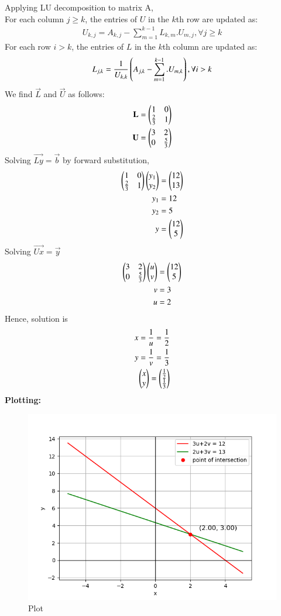 \documentclass[journal]{IEEEtran}
\begin{document}
Applying LU decomposition to matrix A, \\
For each column $j \geq k$, the entries of $U$ in the $k$th row are updated as:
\begin{align}
    U_{k,j} = A_{k,j} - \sum_{m=1}^{k-1} L_{k,m}.U_{m,j},   \forall{j \geq k}
\end{align}
For each row $i > k$, the entries of $L$ in the $k$th column are updated as:
\begin{align}
    L_{j,k} = \frac{1}{U_{k,k}}\left(A_{j,k} - \sum_{m=1}^{k-1}.U_{m,k}\right), \forall{i>k}
\end{align}
We find $\vec{L}$ and $\vec{U}$ as follows:
\begin{align}
    \mathbf{L}=\begin{pmatrix}1 & 0 \\ \frac{2}{3}&1\end{pmatrix}\\
    \mathbf{U}=\begin{pmatrix}3 & 2\\0 & \frac{5}{3}\end{pmatrix}
\end{align}
Solving $\vec{Ly}=\vec{b}$ by forward substitution,
\begin{align}
    \begin{pmatrix}1 & 0 \\ \frac{2}{3}&1\end{pmatrix}\begin{pmatrix}y_1\\y_2\end{pmatrix}&=\begin{pmatrix}12 \\ 13\end{pmatrix}\\
    y_1&=12\\
    y_2&=5\\
    y&=\begin{pmatrix}12\\5\end{pmatrix}
\end{align}
Solving $\vec{Ux}=\vec{y}$
\begin{align}
    \begin{pmatrix}3 & 2\\0 & \frac{5}{3}\end{pmatrix}\begin{pmatrix}u\\v\end{pmatrix}&=\begin{pmatrix}12\\5\end{pmatrix}\\
    v&=3\\
    u&=2
\end{align}
Hence, solution is
\begin{align}
    x=\frac{1}{u}=\frac{1}{2}\\
    y=\frac{1}{v}=\frac{1}{3}\\
    \begin{pmatrix}x\\y\end{pmatrix}=\begin{pmatrix}\frac{1}{2}\\\frac{1}{3}\end{pmatrix}
\end{align}
\textbf{Plotting:}\\
\begin{figure}[h!]
   \centering
   \includegraphics[width=1\columnwidth]{Figs/Figure_1.png}
   \caption{Plot}
\end{figure}
\end{document}
